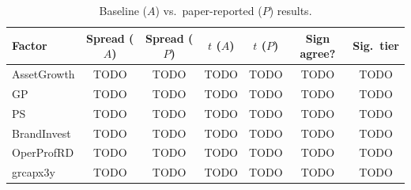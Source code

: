 \begin{table}[htbp]
  \centering
  \caption{Baseline ($A$) vs.\ paper-reported ($P$) results.}
  \label{tab:baseline-vs-paper}
  \begin{tabular}{lcccccc}
    \toprule
    Factor & Spread ($A$) & Spread ($P$) & $t$ ($A$) & $t$ ($P$) & Sign agree? & Sig.\ tier \\
    \midrule
    AssetGrowth & TODO & TODO & TODO & TODO & TODO & TODO \\
    GP          & TODO & TODO & TODO & TODO & TODO & TODO \\
    PS          & TODO & TODO & TODO & TODO & TODO & TODO \\
    BrandInvest & TODO & TODO & TODO & TODO & TODO & TODO \\
    OperProfRD  & TODO & TODO & TODO & TODO & TODO & TODO \\
    grcapx3y    & TODO & TODO & TODO & TODO & TODO & TODO \\
    \bottomrule
  \end{tabular}
\end{table}

